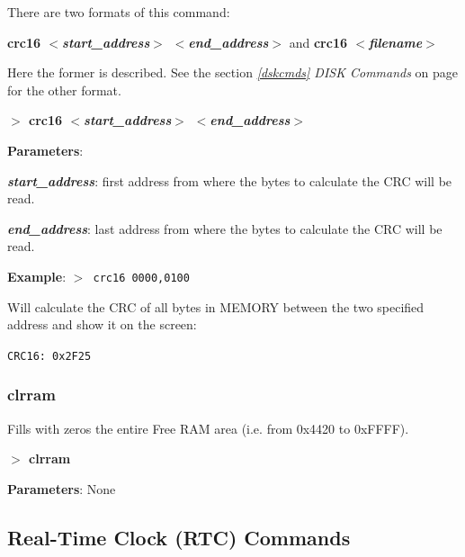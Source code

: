 \documentclass[a4paper,11pt]{article}
\begin{document}
        There are two formats of this command: 
        
        \textbf{crc16 \textit{$<$start\_address$>$ $<$end\_address$>$}}
        and \textbf{crc16 \textit{$<$filename$>$}} 
        
        Here the former is described. See the section \textit{\ref{dskcmds} 
        DISK Commands} on page \pageref{dskcmds} for the other format.

        \hspace{1.9cm}\textbf{$>$ crc16 \textit{$<$start\_address$>$
        $<$end\_address$>$}}
        
        \textbf{Parameters}:

        \hspace{1cm}\textbf{\textit{start\_address}}: first address from
        where the bytes to calculate the CRC will be read.

        \hspace{1cm}\textbf{\textit{end\_address}}: last address from where
        the bytes to calculate the CRC will be read.

        \textbf{Example}: \texttt{$>$ crc16 0000,0100}

        Will calculate the CRC of all bytes in MEMORY between the two
        specified address and show it on the screen:
        
        \hspace{1cm}\texttt{CRC16:\ 0x2F25}

        \subsubsection{{\color{blue}clrram}}
        Fills with zeros the entire Free RAM area (i.e. from 0x4420 to
        0xFFFF).

        \hspace{1.9cm}\textbf{$>$ clrram}

        \textbf{Parameters}: None

    \subsection{Real-Time Clock (RTC) Commands}
\end{document}
